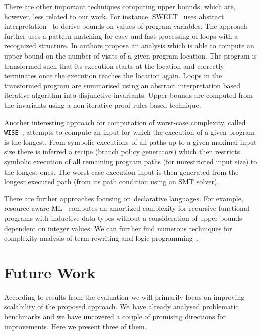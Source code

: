 \documentclass[10pt,a4paper]{article}
\begin{document}
There are other important techniques computing upper bounds, which
are, however, less related to our work. For instance,
\textsc{SWEET}~\cite{Sweet2006} uses abstract
interpretation~\cite{CousotCousot77} to derive bounds on values of program
variables. The approach further uses a pattern matching for easy and fast
processing of loops with a recognized structure. In \cite{SPEED2010} authors
propose an analysis which is able to compute an upper bound on the number of
visits of a given program location. The program is transformed such that its
execution starts at the location and correctly terminates once the execution
reaches the location again. Loops in the transformed program are summarised
using an abstract interpretation based iterative algorithm into disjunctive
invariants. Upper bounds are computed from the invariants using a
non-iterative proof-rules based technique.


Another interesting approach for computation of worst-case complexity,
called \texttt{WISE}~\cite{WISE09}, attempts to compute an input for
which the execution of a given program is the longest. From symbolic
executions of all paths up to a given maximal input size there is
inferred a recipe (branch policy generators) which then restricts
symbolic execution of all remaining program paths (for unrestricted
input size) to the longest ones. The worst-case execution input is
then generated from the longest executed path (from its path condition
using an SMT solver).  

There are further approaches
focusing on declarative languages. For example, resource aware
ML~\cite{Hoffmann2012} computes an amortized complexity for recursive
functional programs with inductive data types without a consideration of
upper bounds dependent on integer values. We can further find numerous
techniques for complexity analysis of term rewriting and logic
programming~\cite{AM13,Giesl13,Debray1993,Navas07}.










\section{Future Work}\label{sec:future}

According to results from the evaluation we will primarily focus on
improving scalability of the proposed approach. We have already
analysed problematic benchmarks and we have uncovered a couple of
promising directions for improvements. Here we present three of them.
\end{document}
